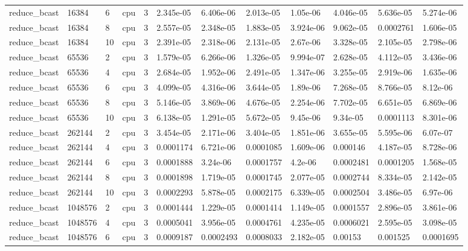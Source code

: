 \begin{tabular}{llllllllllll}
reduce\_bcast & 16384 & 6 & cpu & 3 & 2.345e-05 & 6.406e-06 & 2.013e-05 & 1.05e-06 & 4.046e-05 & 5.636e-05 & 5.274e-06 \\
reduce\_bcast & 16384 & 8 & cpu & 3 & 2.557e-05 & 2.348e-05 & 1.883e-05 & 3.924e-06 & 9.062e-05 & 0.0002761 & 1.606e-05 \\
reduce\_bcast & 16384 & 10 & cpu & 3 & 2.391e-05 & 2.318e-06 & 2.131e-05 & 2.67e-06 & 3.328e-05 & 2.105e-05 & 2.798e-06 \\
reduce\_bcast & 65536 & 2 & cpu & 3 & 1.579e-05 & 6.266e-06 & 1.326e-05 & 9.994e-07 & 2.628e-05 & 4.112e-05 & 3.436e-06 \\
reduce\_bcast & 65536 & 4 & cpu & 3 & 2.684e-05 & 1.952e-06 & 2.491e-05 & 1.347e-06 & 3.255e-05 & 2.919e-06 & 1.635e-06 \\
reduce\_bcast & 65536 & 6 & cpu & 3 & 4.099e-05 & 4.316e-06 & 3.644e-05 & 1.89e-06 & 7.268e-05 & 8.766e-05 & 8.12e-06 \\
reduce\_bcast & 65536 & 8 & cpu & 3 & 5.146e-05 & 3.869e-06 & 4.676e-05 & 2.254e-06 & 7.702e-05 & 6.651e-05 & 6.869e-06 \\
reduce\_bcast & 65536 & 10 & cpu & 3 & 6.138e-05 & 1.291e-05 & 5.672e-05 & 9.45e-06 & 9.34e-05 & 0.0001113 & 8.301e-06 \\
reduce\_bcast & 262144 & 2 & cpu & 3 & 3.454e-05 & 2.171e-06 & 3.404e-05 & 1.851e-06 & 3.655e-05 & 5.595e-06 & 6.07e-07 \\
reduce\_bcast & 262144 & 4 & cpu & 3 & 0.0001174 & 6.721e-06 & 0.0001085 & 1.609e-06 & 0.000146 & 4.187e-05 & 8.728e-06 \\
reduce\_bcast & 262144 & 6 & cpu & 3 & 0.0001888 & 3.24e-06 & 0.0001757 & 4.2e-06 & 0.0002481 & 0.0001205 & 1.568e-05 \\
reduce\_bcast & 262144 & 8 & cpu & 3 & 0.0001898 & 1.719e-05 & 0.0001745 & 2.077e-05 & 0.0002744 & 8.334e-05 & 2.142e-05 \\
reduce\_bcast & 262144 & 10 & cpu & 3 & 0.0002293 & 5.878e-05 & 0.0002175 & 6.339e-05 & 0.0002504 & 3.486e-05 & 6.97e-06 \\
reduce\_bcast & 1048576 & 2 & cpu & 3 & 0.0001444 & 1.229e-05 & 0.0001414 & 1.149e-05 & 0.0001557 & 2.896e-05 & 3.861e-06 \\
reduce\_bcast & 1048576 & 4 & cpu & 3 & 0.0005041 & 3.956e-05 & 0.0004761 & 4.235e-05 & 0.0006021 & 2.595e-05 & 3.098e-05 \\
reduce\_bcast & 1048576 & 6 & cpu & 3 & 0.0009187 & 0.0002493 & 0.0008033 & 2.182e-05 & 0.00153 & 0.001525 & 0.0001695 \\

\end{tabular}
